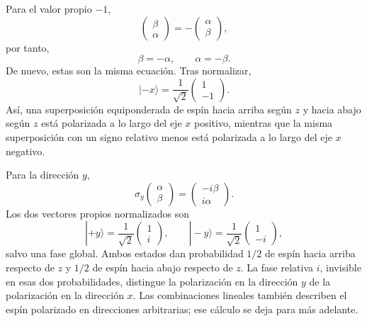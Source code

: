 Para el valor propio \(-1\),
\begin{equation}
\begin{pmatrix}
\beta\\
\alpha
\end{pmatrix}
=
-
\begin{pmatrix}
\alpha\\
\beta
\end{pmatrix},
\end{equation}
por tanto,
\begin{equation}
\beta=-\alpha,
\qquad
\alpha=-\beta.
\end{equation}
De nuevo, estas son la misma ecuación. Tras normalizar,
\begin{equation}
|-x\rangle
=
\frac{1}{\sqrt2}
\begin{pmatrix}
1\\
-1
\end{pmatrix}.
\end{equation}
Así, una superposición equiponderada de espín hacia arriba según \(z\) y hacia abajo según \(z\) está polarizada a lo largo del eje \(x\) positivo, mientras que la misma superposición con un signo relativo menos está polarizada a lo largo del eje \(x\) negativo.

Para la dirección \(y\),
\begin{equation}
\sigma_y
\begin{pmatrix}
\alpha\\
\beta
\end{pmatrix}
=
\begin{pmatrix}
-i\beta\\
i\alpha
\end{pmatrix}.
\end{equation}
Los dos vectores propios normalizados son
\begin{equation}
|+y\rangle
=
\frac{1}{\sqrt2}
\begin{pmatrix}
1\\
i
\end{pmatrix},
\qquad
|-y\rangle
=
\frac{1}{\sqrt2}
\begin{pmatrix}
1\\
-i
\end{pmatrix},
\end{equation}
salvo una fase global. Ambos estados dan probabilidad \(1/2\) de espín hacia arriba respecto de \(z\) y \(1/2\) de espín hacia abajo respecto de \(z\). La fase relativa \(i\), invisible en esas dos probabilidades, distingue la polarización en la dirección \(y\) de la polarización en la dirección \(x\). Las combinaciones lineales también describen el espín polarizado en direcciones arbitrarias; ese cálculo se deja para más adelante.

